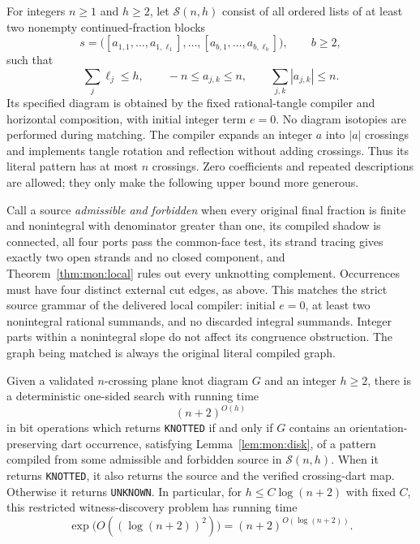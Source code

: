 For integers $n\ge1$ and $h\ge2$, let $\mathcal S(n,h)$ consist of all
ordered lists of at least two nonempty continued-fraction blocks
\[
 s=\bigl([a_{1,1},\ldots,a_{1,\ell_1}],\ldots,
          [a_{b,1},\ldots,a_{b,\ell_b}]\bigr),\qquad b\ge2,
\]
such that
\[
 \sum_j\ell_j\le h,\qquad -n\le a_{j,k}\le n,
 \qquad \sum_{j,k}|a_{j,k}|\le n.
\]
Its specified diagram is obtained by the fixed rational-tangle compiler and
horizontal composition, with initial integer term $e=0$.  No diagram
isotopies are performed during matching.  The compiler expands an integer
$a$ into $|a|$ crossings and implements tangle rotation and reflection
without adding crossings.  Thus its literal pattern has at most $n$
crossings.  Zero coefficients and repeated descriptions are allowed; they
only make the following upper bound more generous.

Call a source \emph{admissible and forbidden} when every original final
fraction is finite and nonintegral with denominator greater than one, its
compiled shadow is connected, all four ports pass the common-face test, its
strand tracing gives exactly two open strands and no closed component, and
Theorem~\ref{thm:mon:local} rules out every unknotting complement. Occurrences
must have four distinct external cut edges, as above. This matches the strict
source grammar of the delivered local compiler: initial $e=0$, at least two
nonintegral rational summands, and no discarded integral summands. Integer
parts within a nonintegral slope do not affect its congruence obstruction.
The graph being matched is always the original literal compiled graph.

\begin{proposition}
\label{prop:mon:bounded-discovery}
Given a validated $n$-crossing plane knot diagram $G$ and an integer $h\ge2$,
there is a deterministic one-sided search with running time
\[
 (n+2)^{O(h)}
\]
in bit operations which returns \texttt{KNOTTED} if and only if $G$ contains
an orientation-preserving dart occurrence, satisfying
Lemma~\ref{lem:mon:disk}, of a pattern compiled from some admissible and
forbidden source in $\mathcal S(n,h)$.  When it returns \texttt{KNOTTED},
it also returns the source and the verified crossing-dart map.  Otherwise it
returns \texttt{UNKNOWN}.  In particular, for
$h\le C\log(n+2)$ with fixed $C$, this restricted witness-discovery problem
has running time
\[
 \exp\bigl(O((\log(n+2))^2)\bigr)
       =(n+2)^{O(\log(n+2))}.
\]
\end{proposition}

